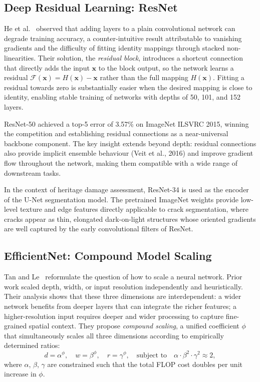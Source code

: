 \documentclass[12pt,a4paper]{article}
\begin{document}
\subsection{Deep Residual Learning: ResNet}

He et al.~\cite{surv:he2016deep} observed that adding layers to a plain convolutional network can degrade training accuracy, a counter-intuitive result attributable to vanishing gradients and the difficulty of fitting identity mappings through stacked non-linearities. Their solution, the \textit{residual block}, introduces a shortcut connection that directly adds the input $\mathbf{x}$ to the block output, so the network learns a residual $\mathcal{F}(\mathbf{x}) = H(\mathbf{x}) - \mathbf{x}$ rather than the full mapping $H(\mathbf{x})$. Fitting a residual towards zero is substantially easier when the desired mapping is close to identity, enabling stable training of networks with depths of 50, 101, and 152 layers.

ResNet-50 achieved a top-5 error of 3.57\% on ImageNet ILSVRC 2015, winning the competition and establishing residual connections as a near-universal backbone component. The key insight extends beyond depth: residual connections also provide implicit ensemble behaviour (Veit et al., 2016) and improve gradient flow throughout the network, making them compatible with a wide range of downstream tasks.

In the context of heritage damage assessment, ResNet-34 is used as the encoder of the U-Net segmentation model. The pretrained ImageNet weights provide low-level texture and edge features directly applicable to crack segmentation, where cracks appear as thin, elongated dark-on-light structures whose oriented gradients are well captured by the early convolutional filters of ResNet.

\subsection{EfficientNet: Compound Model Scaling}

Tan and Le~\cite{tan2019efficientnet} reformulate the question of how to scale a neural network. Prior work scaled depth, width, or input resolution independently and heuristically. Their analysis shows that these three dimensions are interdependent: a wider network benefits from deeper layers that can integrate the richer features; a higher-resolution input requires deeper and wider processing to capture fine-grained spatial context. They propose \textit{compound scaling}, a unified coefficient $\phi$ that simultaneously scales all three dimensions according to empirically determined ratios:
\begin{equation}
  d = \alpha^\phi, \quad w = \beta^\phi, \quad r = \gamma^\phi,
  \quad \text{subject to} \quad \alpha \cdot \beta^2 \cdot \gamma^2 \approx 2,
\end{equation}
where $\alpha$, $\beta$, $\gamma$ are constrained such that the total FLOP cost doubles per unit increase in $\phi$.
\end{document}
